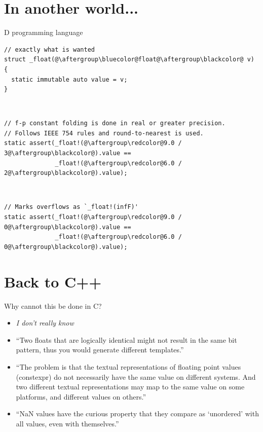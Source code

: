 \documentclass[xcolor=dvipsnames]{beamer}
\def\CC{{C\nolinebreak[4]\hspace{-.05em}\raisebox{.4ex}{\small\bf ++}}}
\begin{document}
\section{In another world...}


\begin{frame}[fragile]{D programming language}
\begin{lstlisting}
// exactly what is wanted
struct _float(@\aftergroup\bluecolor@float@\aftergroup\blackcolor@ v)
{
  static immutable auto value = v;
}
\end{lstlisting}

~

\begin{lstlisting}
// f-p constant folding is done in real or greater precision.
// Follows IEEE 754 rules and round-to-nearest is used.
static assert(_float!(@\aftergroup\redcolor@9.0 / 3@\aftergroup\blackcolor@).value ==
              _float!(@\aftergroup\redcolor@6.0 / 2@\aftergroup\blackcolor@).value);
\end{lstlisting}

~

\begin{lstlisting}
// Marks overflows as `_float!(infF)'
static assert(_float!(@\aftergroup\redcolor@9.0 / 0@\aftergroup\blackcolor@).value ==
              _float!(@\aftergroup\redcolor@6.0 / 0@\aftergroup\blackcolor@).value);
\end{lstlisting}
\end{frame}


\section{Back to {C++}}


\begin{frame}[fragile]{Why cannot this be done in \CC?}
  \begin{itemize}
  \item \emph{I don't really know} \vspace{5mm}
  \item ``Two floats that are logically identical might not result in the same bit pattern, thus you would generate different templates.'' \vspace{5mm}
  \item ``The problem is that the textual representations of floating point values (constexpr) do not necessarily have the same value on different systems. And two different textual representations may map to the same value on some platforms, and different values on others.'' \vspace{5mm}
  \item ``NaN values have the curious property that they compare as `unordered' with all values, even with themselves.'' \vspace{5mm}
  \end{itemize}
\end{frame}
\end{document}
